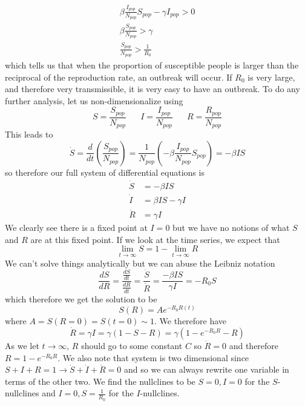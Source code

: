 \documentclass{article}
\newcommand{\od}[2]{\frac{d #1}{d #2}}
\newcommand{\twen}{\hspace{20pt}}
\theoremstyle{definition}
\begin{document}
\begin{equation*}
    \begin{split}
        \beta \frac{I_{pop}}{N_{pop}} S_{pop} - \gamma I_{pop} > 0  \\
        \beta \frac{S_{pop}}{N_{pop}} > \gamma \\
        \frac{S_{pop}}{N_{pop}}>\frac{1}{R_0}
    \end{split}
\end{equation*}
which tells us that when the proportion of susceptible people is larger than the reciprocal of the reproduction rate, an outbreak will occur. If $R_0$ is very large, and therefore very transmissible, it is very easy to have an outbreak. To do any further analysis, let us non-dimensionalize using 
\begin{equation*}
    S= \frac{S_{pop}}{N_{pop}} \twen I=\frac{I_{pop}}{N_{pop}} \twen R= \frac{R_{pop}}{N_{pop}}
\end{equation*}
This leads to 
\begin{equation*}
    \dot S= \od{}{t} \left( \frac{S_{pop}}{N_{pop}} \right) = \frac{1}{N_{pop}} \left( -\beta \frac{I_{pop}}{N_{pop}} S_{pop} \right)= -\beta IS
\end{equation*}
so therefore our full system of differential equations is 
\begin{equation*}
    \begin{split}
        \dot S &= -\beta IS \\
        \dot I &= \beta I S - \gamma I \\
        \dot R &= \gamma I
    \end{split}
\end{equation*}
We clearly see there is a fixed point at $I=0$ but we have no notions of what $S$ and $R$ are at this fixed point. If we look at the time series, we expect that 
\begin{equation*}
    \lim_{t \rightarrow \infty} S = 1- \lim_{t\rightarrow \infty} R
\end{equation*}
We can't solve things analytically but we can abuse the Leibniz notation 
\begin{equation*}
    \od{S}{R} = \frac{\od{S}{t}}{\od{R}{t}} = \frac{\dot S}{\dot R} = \frac{-\beta I S}{\gamma I} = -R_0 S
\end{equation*}
which therefore we get the solution to be 
\begin{equation*}
    S(R) = Ae^{-R_0 R(t)}
\end{equation*}
where $A = S(R=0) = S(t=0) \sim 1$. We therefore have 
\begin{equation*}
    \dot R = \gamma I = \gamma (1-S-R) = \gamma (1 -e^{-R_0 R} -R)
\end{equation*}
As we let $t\rightarrow \infty$, $R$ should go to some constant $C$ so $\dot R=0$ and therefore $R=1-e^{-R_0R}$. We also note that system is two dimensional since $S+I+R=1 \to \dot S+\dot I+\dot R =0$ and so we can always rewrite one variable in terms of the other two. We find the nullclines to be $S=0,I=0$ for the $S$-nullclines and $I=0, S=\frac{1}{R_0}$ for the $I$-nullclines.
\end{document}
